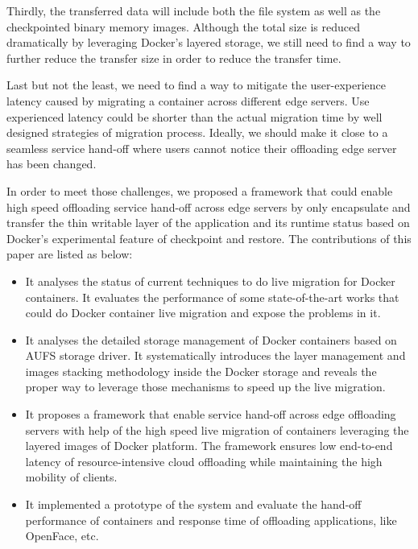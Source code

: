Thirdly, the transferred data will include both the file system as well as the checkpointed binary memory images. Although the total size is reduced dramatically by leveraging Docker's layered storage, we still need to find a way to further reduce the transfer size in order to reduce the transfer time. 

Last but not the least, we need to find a way to mitigate the user-experience latency caused by migrating a container across different edge servers. Use experienced latency could be shorter than the actual migration time by well designed strategies of migration process. Ideally, we should make it close to a seamless service hand-off where users cannot notice their offloading edge server has been changed.

In order to meet those challenges, we proposed a framework that could enable high speed offloading service hand-off across edge servers by only encapsulate and transfer the thin writable layer of the application and its runtime status based on Docker's  experimental feature of checkpoint and restore. The contributions of this paper are listed as below:
\begin{itemize}
    \item It analyses the status of current techniques to do live migration for Docker containers. It evaluates the performance of some state-of-the-art works that could do Docker container live migration and expose the problems in it.
    
     \item It analyses the detailed storage management of Docker containers based on AUFS storage driver. It systematically introduces the layer management and images stacking methodology inside the Docker storage and reveals the proper way to leverage those mechanisms to speed up the live migration.
    
    
    \item It proposes a framework that enable service hand-off across edge offloading servers with help of the high speed live migration of containers leveraging the layered images of Docker platform. The framework ensures low end-to-end latency of resource-intensive cloud offloading while maintaining the high mobility of clients. 
    
    \item It implemented a prototype of the system and evaluate the hand-off performance of containers and response time of offloading applications, like OpenFace, etc. 
    
\end{itemize}